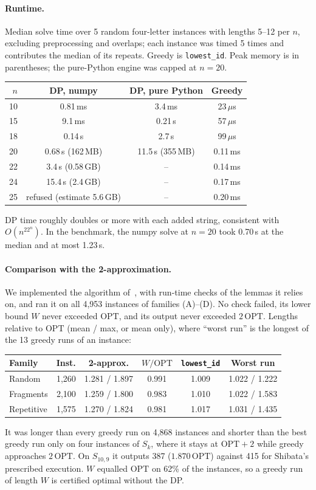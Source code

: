 \documentclass[11pt,a4paper]{article}   %
\theoremstyle{compact}
\theoremstyle{compactdef}
\newcommand{\OPT}{\mathrm{OPT}}
\begin{document}
\paragraph{Runtime.} Median solve time over 5 random four-letter instances
with lengths 5--12 per $n$, excluding preprocessing and overlaps; each
instance was timed 5 times and contributes the median of its repeats. Greedy
is \texttt{lowest\_id}. Peak memory is in parentheses; the
pure-Python engine was capped at $n=20$.
\begin{center}\small
\begin{tabular}{rccc}
\toprule
$n$ & DP, numpy & DP, pure Python & Greedy\\
\midrule
10 & 0.81\,ms & 3.4\,ms & 23\,$\mu$s\\
15 & 9.1\,ms & 0.21\,s & 57\,$\mu$s\\
18 & 0.14\,s & 2.7\,s & 99\,$\mu$s\\
20 & 0.68\,s (162\,MB) & 11.5\,s (355\,MB) & 0.11\,ms\\
22 & 3.4\,s (0.58\,GB) & -- & 0.14\,ms\\
24 & 15.4\,s (2.4\,GB) & -- & 0.17\,ms\\
25 & refused (estimate 5.6\,GB) & -- & 0.20\,ms\\
\bottomrule
\end{tabular}
\end{center}
DP time roughly doubles or more with each added string, consistent with
$O(n^22^n)$. In the benchmark, the numpy solve at $n=20$ took 0.70\,s at
the median and at most 1.23\,s.

\paragraph{Comparison with the 2-approximation.} We implemented the
algorithm of~\cite{OAI26}, with run-time checks of the lemmas it relies on,
and ran it on all 4{,}953 instances of families (A)--(D). No check failed,
its lower bound $W$ never exceeded $\OPT$, and its output never exceeded
$2\,\OPT$. Lengths relative to $\OPT$ (mean / max, or mean only), where
``worst run'' is the longest of the 13 greedy runs of an instance:
\begin{center}\small
\begin{tabular}{lrcccc}
\toprule
Family & Inst. & 2-approx. & $W/\OPT$ & \texttt{lowest\_id} & Worst run\\
\midrule
Random & 1{,}260 & 1.281 / 1.897 & 0.991 & 1.009 & 1.022 / 1.222\\
Fragments & 2{,}100 & 1.259 / 1.800 & 0.983 & 1.010 & 1.022 / 1.583\\
Repetitive & 1{,}575 & 1.270 / 1.824 & 0.981 & 1.017 & 1.031 / 1.435\\
\bottomrule
\end{tabular}
\end{center}
It was longer than every greedy run on 4{,}868 instances and shorter than
the best greedy run only on four instances of $S_k$, where it stays at
$\OPT+2$ while greedy approaches $2\,\OPT$. On $S_{10,9}$ it outputs 387
($1.870\,\OPT$) against 415 for Shibata's prescribed execution. $W$ equalled
$\OPT$ on 62\% of the instances, so a greedy run of length $W$ is certified
optimal without the DP.
\end{document}
